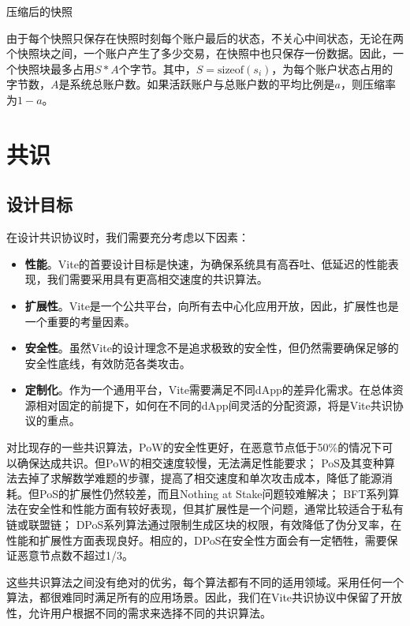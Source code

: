 \documentclass[UTF8,nofonts]{ctexart}
\makeatletter
\newenvironment{figurehere}
 {\def\@captype{figure}}
 {}
\makeatother
\begin{document}
\begin{multicols}{2}
\begin{center}
\begin{figurehere}
\begin{tikzpicture}
\end{tikzpicture}

\caption{压缩后的快照}
\label{fig:compact-snapshot}
\end{figurehere}
\end{center}

由于每个快照只保存在快照时刻每个账户最后的状态，不关心中间状态，无论在两个快照块之间，一个账户产生了多少交易，在快照中也只保存一份数据。因此，一个快照块最多占用$S * A$个字节。其中，$S = \text{sizeof}(s_{i})$，为每个账户状态占用的字节数，$A$是系统总账户数。如果活跃账户与总账户数的平均比例是$a$，则压缩率为$1-a$。

\section{共识}
\subsection{设计目标}
在设计共识协议时，我们需要充分考虑以下因素：
\begin{itemize}
	\item \textbf{性能}。Vite的首要设计目标是快速，为确保系统具有高吞吐、低延迟的性能表现，我们需要采用具有更高相交速度的共识算法。
	\item \textbf{扩展性}。Vite是一个公共平台，向所有去中心化应用开放，因此，扩展性也是一个重要的考量因素。
	\item \textbf{安全性}。虽然Vite的设计理念不是追求极致的安全性，但仍然需要确保足够的安全性底线，有效防范各类攻击。
	\item  \textbf{定制化}。作为一个通用平台，Vite需要满足不同dApp的差异化需求。在总体资源相对固定的前提下，如何在不同的dApp间灵活的分配资源，将是Vite共识协议的重点。
\end{itemize}

对比现存的一些共识算法，PoW的安全性更好，在恶意节点低于50\%的情况下可以确保达成共识。但PoW的相交速度较慢，无法满足性能要求；
PoS及其变种算法去掉了求解数学难题的步骤，提高了相交速度和单次攻击成本，降低了能源消耗。但PoS的扩展性仍然较差，而且Nothing at Stake问题\cite{problems}较难解决；
BFT系列算法在安全性和性能方面有较好表现，但其扩展性是一个问题，通常比较适合于私有链或联盟链；
DPoS\cite{dpos}系列算法通过限制生成区块的权限，有效降低了伪分叉率，在性能和扩展性方面表现良好。相应的，DPoS在安全性方面会有一定牺牲，需要保证恶意节点数不超过1/3\cite{dpos2}。

这些共识算法之间没有绝对的优劣，每个算法都有不同的适用领域。采用任何一个算法，都很难同时满足所有的应用场景。因此，我们在Vite共识协议中保留了开放性，允许用户根据不同的需求来选择不同的共识算法。


\end{multicols}
\end{document}
